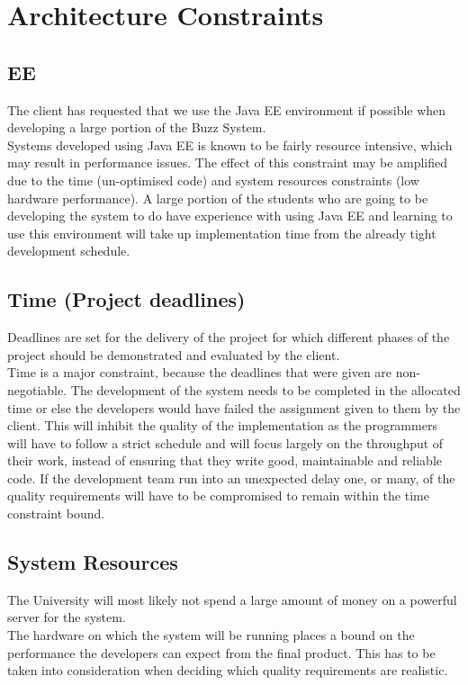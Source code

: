 \section{Architecture Constraints}
\subsection{EE}
The client has requested that we use the Java EE environment if possible when developing a large portion of the Buzz System. \\

Systems developed using Java EE is known to be fairly resource intensive, which may result in performance issues. The effect of this constraint may be amplified due to the time (un-optimised code) and system resources constraints (low hardware performance). A large portion of the students who are going to be developing the system to do have experience with using Java EE and learning to use this environment will take up implementation time from the already tight development schedule.

\subsection{Time (Project deadlines)}
Deadlines are set for the delivery of the project for which different phases of the project should be demonstrated and evaluated by the client. \\

Time is a major constraint, because the deadlines that were given are non-negotiable. The development of the system needs to be completed in the allocated time or else the developers would have failed the assignment given to them by the client. This will inhibit the quality of the implementation as the programmers will have to follow a strict schedule and will focus largely on the throughput of their work, instead of ensuring that they write good, maintainable and reliable code. If the development team run into an unexpected delay one, or many, of the quality requirements will have to be compromised to remain within the time constraint bound.

\subsection{System Resources}
The University will most likely not spend a large amount of money on a powerful server for the system.\\

The hardware on which the system will be running places a bound on the performance the developers can expect from the final product. This has to be taken into consideration when deciding which quality requirements are realistic.
